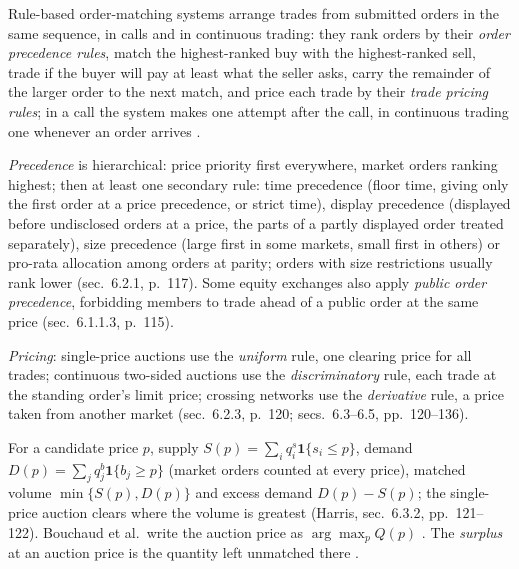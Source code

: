 \begin{qfmechanism}\label{mech:order-matching-pricing}
 Rule-based order-matching systems arrange trades from submitted orders in the same sequence, in calls and in continuous trading: they rank orders by their \emph{order precedence rules}, match the highest-ranked buy with the highest-ranked sell, trade if the buyer will pay at least what the seller asks, carry the remainder of the larger order to the next match, and price each trade by their \emph{trade pricing rules}; in a call the system makes one attempt after the call, in continuous trading one whenever an order arrives \citep[chap.~6, secs.~6.2--6.2.2, pp.~116--119]{alpha-harris}.

\emph{Precedence} is hierarchical: price priority first everywhere, market orders ranking highest; then at least one secondary rule: time precedence (floor time, giving only the first order at a price precedence, or strict time), display precedence (displayed before undisclosed orders at a price, the parts of a partly displayed order treated separately), size precedence (large first in some markets, small first in others) or pro-rata allocation among orders at parity; orders with size restrictions usually rank lower (sec.~6.2.1, p.~117). Some equity exchanges also apply \emph{public order precedence}, forbidding members to trade ahead of a public order at the same price (sec.~6.1.1.3, p.~115).

\emph{Pricing}: single-price auctions use the \emph{uniform} rule, one clearing price for all trades; continuous two-sided auctions use the \emph{discriminatory} rule, each trade at the standing order's limit price; crossing networks use the \emph{derivative} rule, a price taken from another market (sec.~6.2.3, p.~120; secs.~6.3--6.5, pp.~120--136).

 For a candidate price $p$, supply $S(p)=\sum_iq^s_i\mathbf 1\{s_i\le p\}$, demand $D(p)=\sum_jq^b_j\mathbf 1\{b_j\ge p\}$ (market orders counted at every price), matched volume $\min\{S(p),D(p)\}$ and excess demand $D(p)-S(p)$; the single-price auction clears where the volume is greatest (Harris, sec.~6.3.2, pp.~121--122). Bouchaud et al.\ write the auction price as $\arg\max_pQ(p)$ \citep[chap.~3, sec.~3.2.3, eq.~(3.8), p.~56]{catalogue-0528}. The \emph{surplus} at an auction price is the quantity left unmatched there \citep[chap.~2, sec.~2.1.1, p.~122]{alpha-laruelle}.


\end{qfmechanism}
